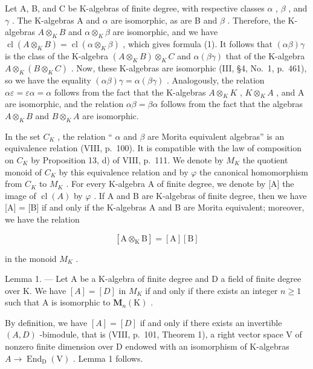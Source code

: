 Let A, B, and C be K-algebras of finite degree, with respective classes \(\alpha\) , \(\beta\) , and \(\gamma\) . The K-algebras A and \(\alpha\) are isomorphic, as are B and \(\beta\) . Therefore, the K-algebras \(A \otimes_{K} B\) and \(\alpha \otimes_{K} \beta\) are isomorphic, and we have \(\operatorname{cl}(A \otimes_{K} B) = \operatorname{cl}(\alpha \otimes_{K} \beta)\) , which gives formula (1). It follows that \((\alpha\beta)\gamma\) is the class of the K-algebra \((A \otimes_{K} B) \otimes_{K} C\) and \(\alpha(\beta\gamma)\) that of the K-algebra \(A \otimes_{K} (B \otimes_{K} C)\) . Now, these K-algebras are isomorphic (III, §4, No.~1, p.~461), so we have the equality \((\alpha\beta)\gamma = \alpha(\beta\gamma)\) . Analogously, the relation \(\alpha\varepsilon = \varepsilon\alpha = \alpha\) follows from the fact that the K-algebras \(A \otimes_{K} K\) , \(K \otimes_{K} A\) , and A are isomorphic, and the relation \(\alpha\beta = \beta\alpha\) follows from the fact that the algebras \(A \otimes_{K} B\) and \(B \otimes_{K} A\) are isomorphic.

In the set \(C_{K}\) , the relation `` \(\alpha\) and \(\beta\) are Morita equivalent algebras'' is an equivalence relation (VIII, p.~100). It is compatible with the law of composition on \(C_{K}\) by Proposition 13, d) of VIII, p.~111. We denote by \(M_{K}\) the quotient monoid of \(C_{K}\) by this equivalence relation and by \(\varphi\) the canonical homomorphism from \(C_{K}\) to \(M_{K}\) . For every K-algebra A of finite degree, we denote by {[}A{]} the image of \(\operatorname{cl}(A)\) by \(\varphi\) . If A and B are K-algebras of finite degree, then we have {[}A{]} = {[}B{]} if and only if the K-algebras A and B are Morita equivalent; moreover, we have the relation

\[
[ \mathrm{A} \otimes_ {\mathrm{K}} \mathrm{B} ] = [ \mathrm{A} ] [ \mathrm{B} ]\tag{2}
\]

in the monoid \(M_{K}\) .

Lemma 1. --- Let A be a K-algebra of finite degree and D a field of finite degree over K. We have \([A]=[D]\) in \(M_{K}\) if and only if there exists an integer \(n\geqslant1\) such that A is isomorphic to \(\mathbf{M}_{n}(\mathrm{K})\) .

By definition, we have \([A]=[D]\) if and only if there exists an invertible \((A,D)\) -bimodule, that is (VIII, p.~101, Theorem 1), a right vector space V of nonzero finite dimension over D endowed with an isomorphism of K-algebras \(A\to\operatorname{End}_{\mathrm{D}}(\mathrm{V})\) . Lemma 1 follows.

